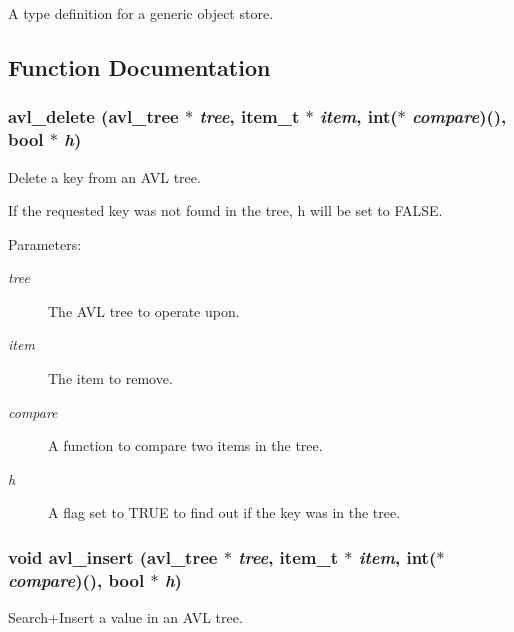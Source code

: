 A type definition for a generic object store.



\subsection{Function Documentation}
\subsubsection{\setlength{\rightskip}{0pt plus 5cm}avl\_\-delete ({\bf avl\_\-tree} $\ast$ {\em tree}, {\bf item\_\-t} $\ast$ {\em item}, int($\ast$ {\em compare})(), {\bf bool} $\ast$ {\em h})}\label{P__AVL_8h_a3}


Delete a key from an AVL tree.



 If the requested key was not found in the tree, h will be set to FALSE.\begin{Desc}
\item[Parameters: ]\par
\begin{description}
\item[{\em 
tree}]The AVL tree to operate upon. \item[{\em 
item}]The item to remove. \item[{\em 
compare}]A function to compare two items in the tree. \item[{\em 
h}]A flag set to TRUE to find out if the key was in the tree. \end{description}
\end{Desc}
\subsubsection{\setlength{\rightskip}{0pt plus 5cm}void avl\_\-insert ({\bf avl\_\-tree} $\ast$ {\em tree}, {\bf item\_\-t} $\ast$ {\em item}, int($\ast$ {\em compare})(), {\bf bool} $\ast$ {\em h})}\label{P__AVL_8h_a2}


Search+Insert a value in an AVL tree.



